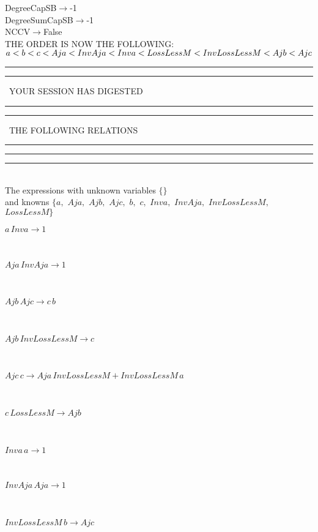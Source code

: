 \documentclass[rep10,leqno]{report}
\begin{document}
DegreeCapSB$\rightarrow $-1\\
DegreeSumCapSB$\rightarrow $-1\\
NCCV$\rightarrow $False\\
THE ORDER IS NOW THE FOLLOWING:\hfil\break
$
a<b<c<Aja<InvAja<Inva<LossLessM<InvLossLessM<Ajb<Ajc\\
$
\rule[2pt]{6in}{4pt}\hfil\break
\rule[2pt]{1.879in}{4pt}
\ YOUR SESSION HAS DIGESTED\ 
\rule[2pt]{1.879in}{4pt}\hfil\break
\rule[2pt]{1.923in}{4pt}
\ THE FOLLOWING RELATIONS\ 
\rule[2pt]{1.923in}{4pt}\hfil\break
\rule[2pt]{6in}{4pt}\hfil\break
\rule[3pt]{6in}{.7pt}\\
The expressions with unknown variables $\{\}$\\
and knowns $\{a,
$ $
Aja,
$ $
Ajb,
$ $
Ajc,
$ $
b,
$ $
c,
$ $
Inva,
$ $
InvAja,
$ $
InvLossLessM,
$ $
LossLessM\}$\smallskip\\
\begin{minipage}{6in}
$
a\,
 Inva\rightarrow 1
$
\end{minipage}\medskip \\
\begin{minipage}{6in}
$
Aja\,
 InvAja\rightarrow 1
$
\end{minipage}\medskip \\
\begin{minipage}{6in}
$
Ajb\,
 Ajc\rightarrow c\,
 b
$
\end{minipage}\medskip \\
\begin{minipage}{6in}
$
Ajb\,
 InvLossLessM\rightarrow c
$
\end{minipage}\medskip \\
\begin{minipage}{6in}
$
Ajc\,
 c\rightarrow Aja\,
 InvLossLessM + InvLossLessM\,
 a
$
\end{minipage}\medskip \\
\begin{minipage}{6in}
$
c\,
 LossLessM\rightarrow Ajb
$
\end{minipage}\medskip \\
\begin{minipage}{6in}
$
Inva\,
 a\rightarrow 1
$
\end{minipage}\medskip \\
\begin{minipage}{6in}
$
InvAja\,
 Aja\rightarrow 1
$
\end{minipage}\medskip \\
\begin{minipage}{6in}
$
InvLossLessM\,
 b\rightarrow Ajc
$
\end{minipage}\medskip \\
\end{document}
